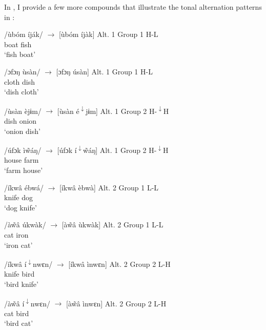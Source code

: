 \documentclass[output=paper]{langscibook}
\begin{document}
In , I provide a few more compounds that illustrate the tonal alternation patterns in : 

\ea\label{ex:glewwe:2} 
\ea \label{ex:glewwe:2a}
\gll /ùbóm íják/  ${\rightarrow}$ [ùbóm íjàk]  Alt. 1 Group 1 H-L\\ 
       boat fish\\
\glt ‘fish boat’ 

\ex\label{ex:glewwe:2b}
\gll   /ɔfɔŋ ùsàn/  ${\rightarrow}$ [ɔfɔŋ úsàn]  Alt. 1 Group 1 H-L\\
       cloth dish\\
\glt ‘dish cloth’ 

\ex\label{ex:glewwe:2c}
\gll   /ùsàn èjɨm/  ${\rightarrow}$ [ùsàn é\textsuperscript{$\downarrow$}jɨm]  Alt. 1 Group 2 H-\textsuperscript{$\downarrow$}H\\
       dish onion\\
\glt   ‘onion dish’ 

\ex\label{ex:glewwe:2d}
\gll   /úfɔk ì\~{w}áŋ/  ${\rightarrow}$ [úfɔk í\textsuperscript{$\downarrow$}\~{w}áŋ]  Alt. 1 Group 2 H-\textsuperscript{$\downarrow$}H\\
       house farm\\
\glt   ‘farm house’

\ex\label{ex:glewwe:2e}
\gll   /íkwâ ébwá/ ${\rightarrow}$ [íkwâ èbwà]  Alt. 2 Group 1 L-L\\
       knife dog\\
\glt   ‘dog knife’

\ex\label{ex:glewwe:2f}
\gll   /à\~{w}â úkwàk/ ${\rightarrow}$ [à\~{w}â ùkwàk]  Alt. 2 Group 1 L-L\\
       cat iron\\
\glt   ‘iron cat’

\ex\label{ex:glewwe:2g}
\gll   /íkwâ í\textsuperscript{$\downarrow$}nwɛn/ ${\rightarrow}$ [íkwâ ìnwɛn]  Alt. 2 Group 2 L-H\\
       knife bird\\
\glt   ‘bird knife’

\ex\label{ex:glewwe:2h}
\gll   /à\~{w}â í\textsuperscript{$\downarrow$}nwɛn/ ${\rightarrow}$ [à\~{w}â ìnwɛn]  Alt. 2 Group 2 L-H\\
       cat bird\\
\glt   ‘bird cat’
\z
\z
\end{document}
